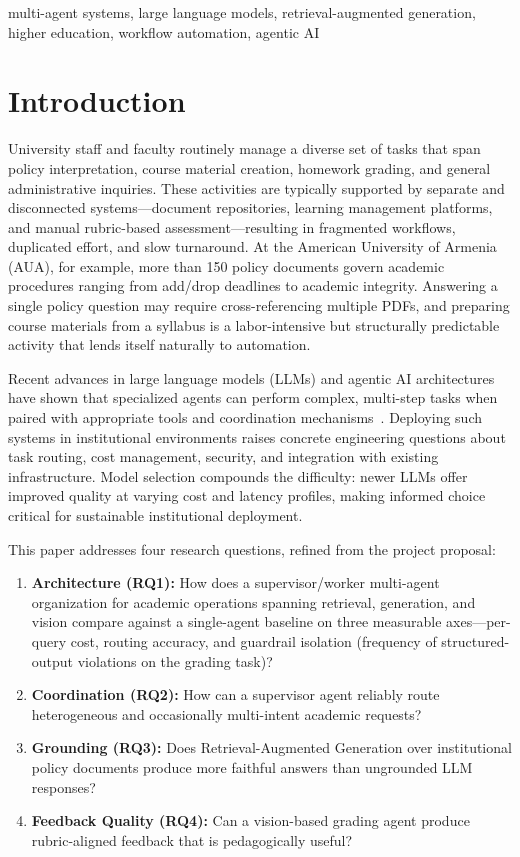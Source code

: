 \documentclass[conference]{IEEEtran}
\begin{document}
\begin{IEEEkeywords}
multi-agent systems, large language models, retrieval-augmented generation, higher education, workflow automation, agentic AI
\end{IEEEkeywords}

\section{Introduction}

University staff and faculty routinely manage a diverse set of tasks that span policy interpretation, course material creation, homework grading, and general administrative inquiries. These activities are typically supported by separate and disconnected systems---document repositories, learning management platforms, and manual rubric-based assessment---resulting in fragmented workflows, duplicated effort, and slow turnaround. At the American University of Armenia (AUA), for example, more than 150 policy documents govern academic procedures ranging from add/drop deadlines to academic integrity. Answering a single policy question may require cross-referencing multiple PDFs, and preparing course materials from a syllabus is a labor-intensive but structurally predictable activity that lends itself naturally to automation.

Recent advances in large language models (LLMs) and agentic AI architectures have shown that specialized agents can perform complex, multi-step tasks when paired with appropriate tools and coordination mechanisms~\cite{yao2023react,langchain2024,langgraph2024}. Deploying such systems in institutional environments raises concrete engineering questions about task routing, cost management, security, and integration with existing infrastructure. Model selection compounds the difficulty: newer LLMs offer improved quality at varying cost and latency profiles, making informed choice critical for sustainable institutional deployment.

This paper addresses four research questions, refined from the project proposal:
\begin{enumerate}
    \item \textbf{Architecture (RQ1):} How does a supervisor/worker multi-agent organization for academic operations spanning retrieval, generation, and vision compare against a single-agent baseline on three measurable axes---per-query cost, routing accuracy, and guardrail isolation (frequency of structured-output violations on the grading task)?
    \item \textbf{Coordination (RQ2):} How can a supervisor agent reliably route heterogeneous and occasionally multi-intent academic requests?
    \item \textbf{Grounding (RQ3):} Does Retrieval-Augmented Generation over institutional policy documents produce more faithful answers than ungrounded LLM responses?
    \item \textbf{Feedback Quality (RQ4):} Can a vision-based grading agent produce rubric-aligned feedback that is pedagogically useful?
\end{enumerate}
\end{document}
